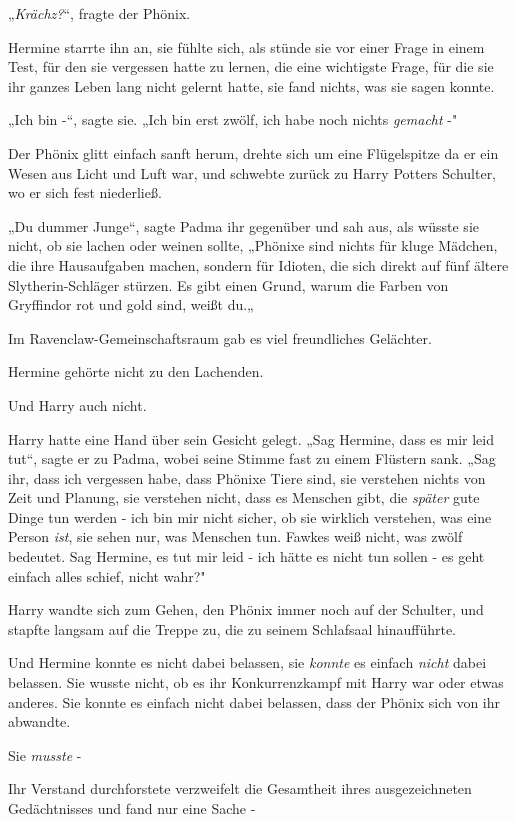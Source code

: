 {„\emph{Krächz?}“, fragte der Phönix.

Hermine starrte ihn an, sie fühlte sich, als stünde sie vor einer Frage in einem Test, für den sie vergessen hatte zu lernen, die eine wichtigste Frage, für die sie ihr ganzes Leben lang nicht gelernt hatte, sie fand nichts, was sie sagen konnte.

„Ich bin -“, sagte sie. „Ich bin erst zwölf, ich habe noch nichts \emph{gemacht} -"

Der Phönix glitt einfach sanft herum, drehte sich um eine Flügelspitze da er ein Wesen aus Licht und Luft war, und schwebte zurück zu Harry Potters Schulter, wo er sich fest niederließ.

„Du dummer Junge“, sagte Padma ihr gegenüber und sah aus, als wüsste sie nicht, ob sie lachen oder weinen sollte, „Phönixe sind nichts für kluge Mädchen, die ihre Hausaufgaben machen, sondern für Idioten, die sich direkt auf fünf ältere Slytherin-Schläger stürzen. Es gibt einen Grund, warum die Farben von Gryffindor rot und gold sind, weißt du.„

Im Ravenclaw-Gemeinschaftsraum gab es viel freundliches Gelächter.

Hermine gehörte nicht zu den Lachenden.

Und Harry auch nicht.

Harry hatte eine Hand über sein Gesicht gelegt. „Sag Hermine, dass es mir leid tut“, sagte er zu Padma, wobei seine Stimme fast zu einem Flüstern sank. „Sag ihr, dass ich vergessen habe, dass Phönixe Tiere sind, sie verstehen nichts von Zeit und Planung, sie verstehen nicht, dass es Menschen gibt, die \emph{später} gute Dinge tun werden - ich bin mir nicht sicher, ob sie wirklich verstehen, was eine Person \emph{ist}, sie sehen nur, was Menschen tun. Fawkes weiß nicht, was zwölf bedeutet. Sag Hermine, es tut mir leid - ich hätte es nicht tun sollen - es geht einfach alles schief, nicht wahr?"

Harry wandte sich zum Gehen, den Phönix immer noch auf der Schulter, und stapfte langsam auf die Treppe zu, die zu seinem Schlafsaal hinaufführte.

Und Hermine konnte es nicht dabei belassen, sie \emph{konnte} es einfach \emph{nicht} dabei belassen. Sie wusste nicht, ob es ihr Konkurrenzkampf mit Harry war oder etwas anderes. Sie konnte es einfach nicht dabei belassen, dass der Phönix sich von ihr abwandte.

Sie \emph{musste} -

Ihr Verstand durchforstete verzweifelt die Gesamtheit ihres ausgezeichneten Gedächtnisses und fand nur eine Sache -

}
